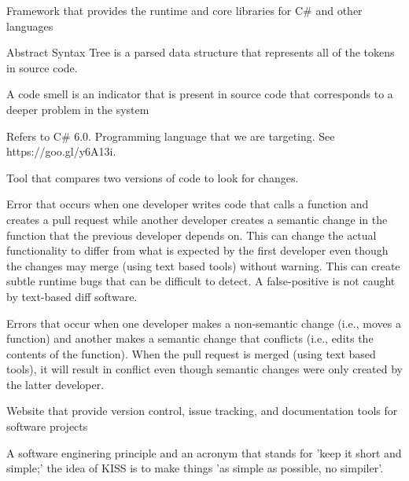 \documentclass[draftclsnofoot,onecolumn]{IEEEtran}
\begin{document}
\begin{description} 

\item[.NET:] Framework that provides the runtime and core libraries for C\# 
and other languages

\item[AST:] Abstract Syntax Tree is a parsed data structure that represents 
all of the tokens in source code.

\item[Code Smell:] A code smell is an indicator that is present in source
code that corresponds to a deeper problem in the system

\item[C\#:] Refers to C\# 6.0. Programming language that we are targeting. 
See https://goo.gl/y6A13i.

\item[Diff:] Tool that compares two versions of code to look for changes.

\item[False-Positive:] Error that occurs when one developer writes code that 
calls a function and creates a pull request while another developer creates a 
semantic change in the function that the previous developer depends on. This 
can change the actual functionality to differ from what is expected by the 
first developer even though the changes may merge (using text based tools) 
without warning. This can create subtle runtime bugs that can be difficult to 
detect. A false-positive is not caught by text-based diff software.

\item[False-Negative:] Errors that occur when one developer makes a 
non-semantic change (i.e., moves a function) and another makes a semantic 
change that conflicts (i.e., edits the contents of the function). When the 
pull request is merged (using text based tools), it will result in conflict 
even though semantic changes were only created by the latter developer.

\item[GitHub:] Website that provide version control, issue tracking, and 
documentation tools for software projects

\item[KISS:] A software enginering principle and an acronym that stands for 
'keep it short and simple;' the idea of KISS is to make things 'as simple as 
possible, no simpiler'.


\end{description}
\end{document}
